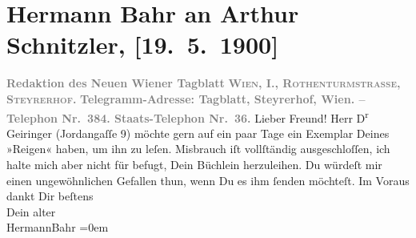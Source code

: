 

         
         \renewcommand{\erwaehntePersonen}{Personen: Friedrich Geiringer}
         \renewcommand{\erwaehnteInstitutionen}{Institutionen: Neues Wiener Tagblatt}
         \renewcommand{\erwaehnteOrte}{Orte: Jordangasse, Steyrerhof, Wien}
         \renewcommand{\erwaehnteWerke}{Werke: Reigen. Zehn Dialoge}
               \section[Hermann Bahr an Arthur Schnitzler, {[}19. 5. 1900{]}]{ Hermann Bahr an Arthur Schnitzler, {[}19. 5. 1900{]}}\nopagebreak{}\rehead{ }\begin{ledgroupsized}[t]{13cm}\normalsize\beginnumbering \toendnotes[C]{\smallbreak\pagebreak[2]} 
\pstart
           \noindent{}\centering{}{\pb}\textcolor{gray}{\textbf{Redaktion des Neuen Wiener
                        Tagblatt}}\pend
           \pstart
           \noindent{}\centering{}\textcolor{gray}{\textbf{\textsc{Wien, I., Rothenturmstrasse,
                        Steyrerhof.}}}\pend
           \pstart
           \noindent{}\centering{}\textcolor{gray}{\textbf{Telegramm-Adresse: Tagblatt, Steyrerhof, Wien. –
                     Telephon Nr. 384. Staats-Telephon Nr. 36.}}\pend
           \pstart\center{}Lieber Freund!\pend\pstart
           Herr D\textsuperscript{r}{ }Geiringer (Jordangaſſe 9) möchte gern auf ein paar Tage ein Exemplar Deines »Reigen« haben, um ihn zu leſen. Misbrauch iſt
               vollſtändig ausgeschloſſen, ich halte mich aber nicht für befugt, Dein Büchlein
               herzuleihen. Du würdeſt mir einen ungewöhnlichen Gefallen thun, wenn Du es ihm ſenden
               möchteſt.\pend
           \pstart
           Im Voraus dankt Dir beſtens{\\[\baselineskip]}Dein alter{\\[\baselineskip]}\spacefill\mbox{HermannBahr}\pend
           \leftskip=0em{}
         

\end{ledgroupsized}
